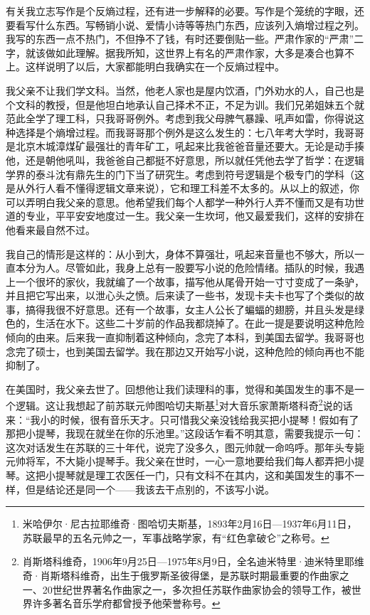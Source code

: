 \documentclass[12pt,a5paper]{ctexbook}
\begin{document}
有关我立志写作是个反熵过程，还有进一步解释的必要。写作是个笼统的字眼，还要看写什么东西。写畅销小说、爱情小诗等等热门东西，应该列入熵增过程之列。我写的东西一点不热门，不但挣不了钱，有时还要倒贴一些。严肃作家的“严肃”二字，就该做如此理解。据我所知，这世界上有名的严肃作家，大多是凑合也算不上。这样说明了以后，大家都能明白我确实在一个反熵过程中。

我父亲不让我们学文科。当然，他老人家也是屋内饮酒，门外劝水的人，自己也是个文科的教授，但是他坦白地承认自己择术不正，不足为训。我们兄弟姐妹五个就范此全学了理工科，只我哥哥例外。考虑到我父母脾气暴躁、吼声如雷，你得说这种选择是个熵增过程。而我哥哥那个例外是这么发生的：七八年考大学时，我哥哥是北京木城漳煤矿最强壮的青年矿工，吼起来比我爸爸音量还要大。无论是动手揍他，还是朝他吼叫，我爸爸自己都挺不好意思，所以就任凭他去学了哲学：在逻辑学界的泰斗沈有鼎先生的门下当了研究生。考虑到符号逻辑是个极专门的学科（这是从外行人看不懂得逻辑文章来说），它和理工科差不太多的。从以上的叙述，你可以弄明白我父亲的意思。他希望我们每个人都学一种外行人弄不懂而又是有功世道的专业，平平安安地度过一生。我父亲一生坎坷，他又最爱我们，这样的安排在他看来最自然不过。

我自己的情形是这样的：从小到大，身体不算强壮，吼起来音量也不够大，所以一直本分为人。尽管如此，我身上总有一股要写小说的危险情绪。插队的时候，我遇上一个很坏的家伙，我就编了一个故事，描写他从尾骨开始一寸寸变成了一条驴，并且把它写出来，以泄心头之愤。后来读了一些书，发现卡夫卡也写了个类似的故事，搞得我很不好意思。还有一个故事，女主人公长了蝙蝠的翅膀，并且头发是绿色的，生活在水下。这些二十岁前的作品我都烧掉了。在此一提是要说明这种危险倾向的由来。后来我一直抑制着这种倾向，念完了本科，到美国去留学。我哥哥也念完了硕士，也到美国去留学。我在那边又开始写小说，这种危险的倾向再也不能抑制了。

在美国时，我父亲去世了。回想他让我们读理科的事，觉得和美国发生的事不是一个逻辑。这让我想起了前苏联元帅图哈切夫斯基\footnote{米哈伊尔·尼古拉耶维奇·图哈切夫斯基，1893年2月16日—1937年6月11日，苏联最早的五名元帅之一，军事战略学家，有“红色拿破仑”之称号。}对大音乐家萧斯塔科奇\footnote{肖斯塔科维奇，1906年9月25日—1975年8月9日，全名迪米特里·迪米特里耶维奇·肖斯塔科维奇，出生于俄罗斯圣彼得堡，是苏联时期最重要的作曲家之一、20世纪世界著名作曲家之一，多次担任苏联作曲家协会的领导工作，被世界许多著名音乐学府都曾授予他荣誉称号。}说的话来：“我小的时候，很有音乐天才。只可惜我父亲没钱给我买把小提琴！假如有了那把小提琴，我现在就坐在你的乐池里。”这段话乍看不明其意，需要我提示一句：这次对话发生在苏联的三十年代，说完了没多久，图元帅就一命呜呼。那年头专毙元帅将军，不大毙小提琴手。我父亲在世时，一心一意地要给我们每人都弄把小提琴。这把小提琴就是理工农医任一门，只有文科不在其内，这和美国发生的事不一样，但是结论还是同一个——我该去干点别的，不该写小说。
\end{document}

